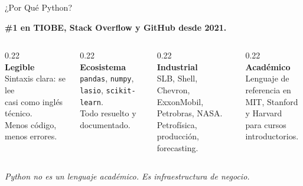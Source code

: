 \documentclass[aspectratio=169, 11pt]{beamer}
\begin{document}
\begin{frame}{¿Por Qué Python?}
  \vspace{-2pt}
  \centering

  {\small\color{arcaDark}\bfseries
    \#1 en TIOBE, Stack Overflow y GitHub desde 2021.}

  \vspace{10pt}
  \begin{columns}[T]
    \begin{column}{0.22\textwidth}
      \centering
      {\Huge\color{arcaRed}\faChartLine}\\[6pt]
      {\small\bfseries\color{arcaDark} Legible}\\[3pt]
      {\scriptsize\color{textMuted} Sintaxis clara: se lee\\
      casi como inglés técnico.\\
      Menos código, menos errores.}
    \end{column}

    \begin{column}{0.22\textwidth}
      \centering
      {\Huge\color{arcaRed}\faCubes}\\[6pt]
      {\small\bfseries\color{arcaDark} Ecosistema}\\[3pt]
      {\scriptsize\color{textMuted} \texttt{pandas}, \texttt{numpy},\\
      \texttt{lasio}, \texttt{scikit-learn}.\\
      Todo resuelto y documentado.}
    \end{column}

    \begin{column}{0.22\textwidth}
      \centering
      {\Huge\color{arcaRed}\faIndustry}\\[6pt]
      {\small\bfseries\color{arcaDark} Industrial}\\[3pt]
      {\scriptsize\color{textMuted} SLB, Shell, Chevron,\\
      ExxonMobil, Petrobras, NASA.\\
      Petrofísica, producción, forecasting.}
    \end{column}

    \begin{column}{0.22\textwidth}
      \centering
      {\Huge\color{arcaRed}\faGraduationCap}\\[6pt]
      {\small\bfseries\color{arcaDark} Académico}\\[3pt]
      {\scriptsize\color{textMuted} Lenguaje de referencia en\\
      MIT, Stanford y Harvard\\
      para cursos introductorios.}
    \end{column}
  \end{columns}

  \vspace{12pt}
  {\footnotesize\color{arcaDark}\itshape
    Python no es un lenguaje académico. Es infraestructura de negocio.}
\end{frame}
\end{document}
